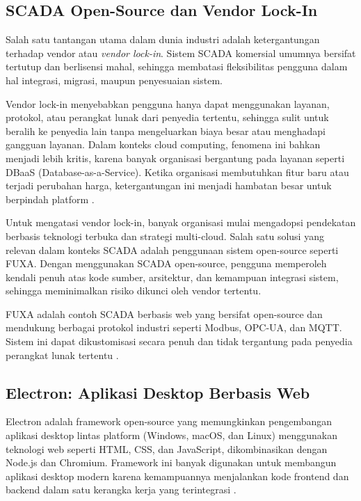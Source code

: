 \subsection{SCADA Open-Source dan Vendor Lock-In}
Salah satu tantangan utama dalam dunia industri adalah ketergantungan terhadap vendor atau \textit{vendor lock-in}. Sistem SCADA komersial umumnya bersifat tertutup dan berlisensi mahal, sehingga membatasi fleksibilitas pengguna dalam hal integrasi, migrasi, maupun penyesuaian sistem.

Vendor lock-in menyebabkan pengguna hanya dapat menggunakan layanan, protokol, atau perangkat lunak dari penyedia tertentu, sehingga sulit untuk beralih ke penyedia lain tanpa mengeluarkan biaya besar atau menghadapi gangguan layanan. Dalam konteks cloud computing, fenomena ini bahkan menjadi lebih kritis, karena banyak organisasi bergantung pada layanan seperti DBaaS (Database-as-a-Service). Ketika organisasi membutuhkan fitur baru atau terjadi perubahan harga, ketergantungan ini menjadi hambatan besar untuk berpindah platform \parencite{banthia2024vendorlockin}.

Untuk mengatasi vendor lock-in, banyak organisasi mulai mengadopsi pendekatan berbasis teknologi terbuka dan strategi multi-cloud. Salah satu solusi yang relevan dalam konteks SCADA adalah penggunaan sistem open-source seperti FUXA. Dengan menggunakan SCADA open-source, pengguna memperoleh kendali penuh atas kode sumber, arsitektur, dan kemampuan integrasi sistem, sehingga meminimalkan risiko dikunci oleh vendor tertentu.

FUXA adalah contoh SCADA berbasis web yang bersifat open-source dan mendukung berbagai protokol industri seperti Modbus, OPC-UA, dan MQTT. Sistem ini dapat dikustomisasi secara penuh dan tidak tergantung pada penyedia perangkat lunak tertentu \parencite{seeed2024fuxa}.

\subsection{Electron: Aplikasi Desktop Berbasis Web}
Electron adalah framework open-source yang memungkinkan pengembangan aplikasi desktop lintas platform (Windows, macOS, dan Linux) menggunakan teknologi web seperti HTML, CSS, dan JavaScript, dikombinasikan dengan Node.js dan Chromium. Framework ini banyak digunakan untuk membangun aplikasi desktop modern karena kemampuannya menjalankan kode frontend dan backend dalam satu kerangka kerja yang terintegrasi \parencite{electron2024why}.

